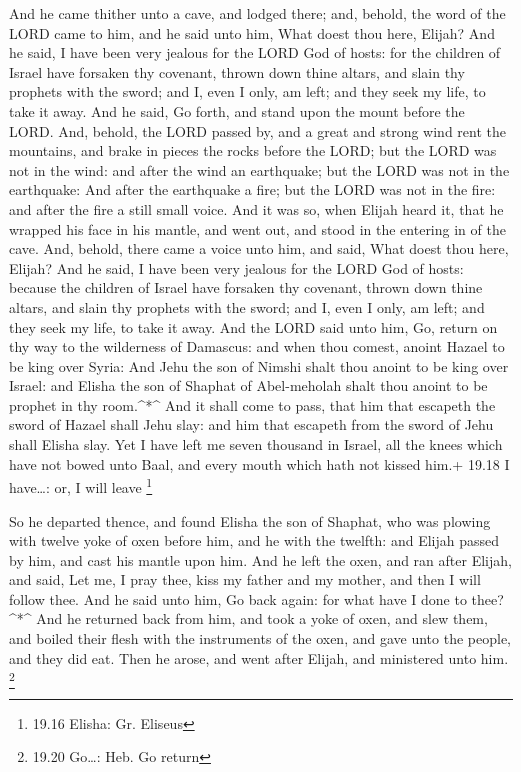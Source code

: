  And he came thither unto a cave, and lodged there; and,
behold, the word of the LORD came to him, and he said unto him, What
doest thou here, Elijah?  And he said, I have been very
jealous for the LORD God of hosts: for the children of Israel have
forsaken thy covenant, thrown down thine altars, and slain thy prophets
with the sword; and I, even I only, am left; and they seek my life, to
take it away.  And he said, Go forth, and stand upon the
mount before the LORD. And, behold, the LORD passed by, and a great and
strong wind rent the mountains, and brake in pieces the rocks before the
LORD; but the LORD was not in the wind: and after the wind an
earthquake; but the LORD was not in the earthquake:  And
after the earthquake a fire; but the LORD was not in the fire: and after
the fire a still small voice.  And it was so, when Elijah
heard it, that he wrapped his face in his mantle, and went out, and
stood in the entering in of the cave. And, behold, there came a voice
unto him, and said, What doest thou here, Elijah?  And he
said, I have been very jealous for the LORD God of hosts: because the
children of Israel have forsaken thy covenant, thrown down thine altars,
and slain thy prophets with the sword; and I, even I only, am left; and
they seek my life, to take it away.  And the LORD said unto
him, Go, return on thy way to the wilderness of Damascus: and when thou
comest, anoint Hazael to be king over Syria:  And Jehu the
son of Nimshi shalt thou anoint to be king over Israel: and Elisha the
son of Shaphat of Abel-meholah shalt thou anoint to be prophet in thy
room.\^{}*\^{}  And it shall come to pass, that him that
escapeth the sword of Hazael shall Jehu slay: and him that escapeth from
the sword of Jehu shall Elisha slay.  Yet I have left me
seven thousand in Israel, all the knees which have not bowed unto Baal,
and every mouth which hath not kissed him.+ 19.18 I have\ldots: or, I
will leave \footnote{19.16 Elisha: Gr. Eliseus}

 So he departed thence, and found Elisha the son of
Shaphat, who was plowing with twelve yoke of oxen before him, and he
with the twelfth: and Elijah passed by him, and cast his mantle upon
him.  And he left the oxen, and ran after Elijah, and said,
Let me, I pray thee, kiss my father and my mother, and then I will
follow thee. And he said unto him, Go back again: for what have I done
to thee?\^{}*\^{}  And he returned back from him, and took
a yoke of oxen, and slew them, and boiled their flesh with the
instruments of the oxen, and gave unto the people, and they did eat.
Then he arose, and went after Elijah, and ministered unto him.
\footnote{19.20 Go\ldots: Heb. Go return}

